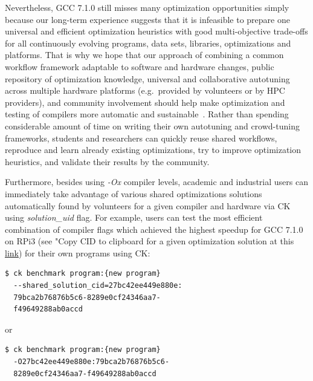 Nevertheless, GCC 7.1.0 still misses many optimization opportunities 
simply because our long-term experience suggests that it is infeasible 
to prepare one universal and efficient optimization heuristics 
with good multi-objective trade-offs for all continuously 
evolving programs, data sets, libraries, optimizations and platforms.
%
That is why we hope that our approach of combining a common workflow framework
adaptable to software and hardware changes, public repository of optimization knowledge, 
universal and collaborative autotuning across multiple hardware platforms 
(e.g.~provided by volunteers or by HPC providers), and community involvement 
should help make optimization and testing of compilers
more automatic and sustainable~\cite{cm:29db2248aba45e59:cd11e3a188574d80,ck-date16}.
%
Rather than spending considerable amount of time on writing their own autotuning and crowd-tuning
frameworks, students and researchers can quickly reuse shared workflows, 
reproduce and learn already existing optimizations, try to improve optimization heuristics, 
and validate their results by the community. 

Furthermore, besides using \textit{-Ox} compiler levels, academic and industrial users 
can immediately take advantage of various shared optimizations solutions automatically
found by volunteers for a given compiler and hardware via CK using \textit{solution\_uid} flag.
%
For example, users can test the most efficient combination of compiler flags 
which achieved the highest speedup for GCC 7.1.0 on RPi3 
(see "Copy CID to clipboard  for a given optimization solution at this 
\href{http://cknowledge.org/repo/web.php?wcid=8289e0cf24346aa7:79bca2b76876b5c6}{link})
for their own programs using CK:

\begin{lstlisting}[breaklines]
$ ck benchmark program:{new program}
  --shared_solution_cid=27bc42ee449e880e:
  79bca2b76876b5c6-8289e0cf24346aa7-
  f49649288ab0accd
\end{lstlisting}

or

\begin{lstlisting}[breaklines]
$ ck benchmark program:{new program} 
  -O27bc42ee449e880e:79bca2b76876b5c6-
  8289e0cf24346aa7-f49649288ab0accd
\end{lstlisting}
